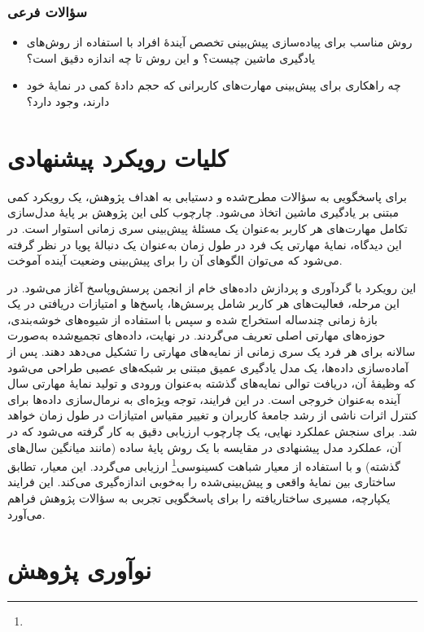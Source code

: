 \subsubsection*{سؤالات فرعی}
\begin{itemize}
    \item  روش مناسب برای پیاده‌سازی پیش‌بینی تخصص آیندهٔ افراد با استفاده از روش‌های یادگیری ماشین چیست؟ و این روش تا چه اندازه دقیق است؟
    \item چه راهکاری برای پیش‌بینی مهارت‌های کاربرانی که حجم دادهٔ کمی در نمایهٔ خود دارند، وجود دارد؟
\end{itemize}

\section{کلیات رویکرد پیشنهادی}

برای پاسخگویی به سؤالات مطرح‌شده و دستیابی به اهداف پژوهش، یک رویکرد کمی مبتنی بر یادگیری ماشین اتخاذ می‌شود. چارچوب کلی این پژوهش بر پایهٔ مدل‌سازی تکامل مهارت‌های هر کاربر به‌عنوان یک مسئلهٔ پیش‌بینی سری زمانی استوار است. در این دیدگاه، نمایهٔ مهارتی یک فرد در طول زمان به‌عنوان یک دنبالهٔ پویا در نظر گرفته می‌شود که می‌توان الگوهای آن را برای پیش‌بینی وضعیت آینده آموخت.

این رویکرد با گردآوری و پردازش داده‌های خام از انجمن پرسش‌وپاسخ  آغاز می‌شود. در این مرحله، فعالیت‌های هر کاربر شامل پرسش‌ها، پاسخ‌ها و امتیازات دریافتی در یک بازهٔ زمانی چندساله استخراج شده و سپس با استفاده از شیوه‌های خوشه‌بندی، حوزه‌های مهارتی اصلی تعریف می‌گردند. در نهایت، داده‌های تجمیع‌شده به‌صورت سالانه برای هر فرد یک سری زمانی از نمایه‌های مهارتی را تشکیل می‌دهد دهند. پس از آماده‌سازی داده‌ها، یک مدل یادگیری عمیق مبتنی بر شبکه‌های عصبی طراحی می‌شود که وظیفهٔ آن، دریافت توالی نمایه‌های گذشته به‌عنوان ورودی و تولید نمایهٔ مهارتی سال آینده به‌عنوان خروجی است. در این فرایند، توجه ویژه‌ای به نرمال‌سازی داده‌ها برای کنترل اثرات ناشی از رشد جامعهٔ کاربران و تغییر مقیاس امتیازات در طول زمان خواهد شد. برای سنجش عملکرد نهایی، یک چارچوب ارزیابی دقیق به کار گرفته می‌شود که در آن، عملکرد مدل پیشنهادی در مقایسه با یک روش پایهٔ ساده (مانند میانگین سال‌های گذشته) و با استفاده از معیار شباهت کسینوسی\footnote{} ارزیابی می‌گردد. این معیار، تطابق ساختاری بین نمایهٔ واقعی و پیش‌بینی‌شده را به‌خوبی اندازه‌گیری می‌کند. این فرایند یکپارچه، مسیری ساختاریافته را برای پاسخگویی تجربی به سؤالات پژوهش فراهم می‌آورد.


\section{نوآوری پژوهش}

